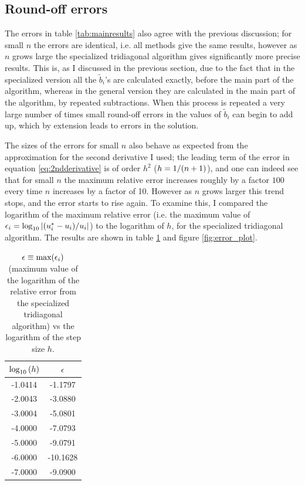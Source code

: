 \documentclass[a4paper,english]{article}
\newcommand\norm[1]{\left\lvert#1\right\rvert}
\let\originalleft\left
\let\originalright\right
\renewcommand{\left}{\mathopen{}\mathclose\bgroup\originalleft}
\renewcommand{\right}{\aftergroup\egroup\originalright}
\begin{document}
\subsection{Round-off errors}
The errors in table \ref{tab:mainresults} also agree with the previous discussion; for small $n$ the errors are identical, i.e. all methods give the same results, however as $n$ grows large the specialized tridiagonal algorithm gives significantly more precise results. This is, as  I discussed in the previous section, due to the fact that in the specialized version all the $\tilde{b}_i$'s are calculated exactly, before the main part of the algorithm, whereas in the general version they are calculated in the main part of the algorithm, by repeated subtractions. When this process is repeated a very large number of times small round-off errors in the values of $\tilde{b}_i$ can begin to add up, which by extension leads to errors in the solution. \par
The sizes of the errors for small $n$ also behave as expected from the approximation for the second derivative I used; the leading term of the error in equation \ref{eq:2ndderivative} is of order $h^2$\cite{lecturenotes} ($h=1/\left(n+1\right)$), and one can indeed see that for small $n$ the maximum relative error increases roughly by a factor $100$ every time $n$ increases by a factor of 10. However as $n$ grows larger this trend stops, and the error starts to rise again. To examine this, I compared the logarithm of the maximum relative error (i.e. the maximum value of $\epsilon_i = \log_{10}{\norm{\left(u^*_i-u_i\right)/u_i}}$) to the logarithm of $h$, for the specialized tridiagonal algorithm. The results are shown in table \ref{tab:error_tab} and figure \ref{fig:error_plot}.
\begin{table}[ht]
  \centering
  \begin{tabular}{c c} \toprule
    $\log_{10}{\left(h\right)}$ & $\epsilon$ \\\midrule
    -1.0414 & -1.1797 \\
    -2.0043 & -3.0880 \\
    -3.0004 & -5.0801 \\
    -4.0000 & -7.0793 \\
    -5.0000 & -9.0791 \\
    -6.0000 & -10.1628 \\
    -7.0000 & -9.0900\\\bottomrule
  \end{tabular}
  \caption{$\epsilon \equiv \text{max}\left(\epsilon_i\right)$ (maximum value of the logarithm of the relative error from the specialized tridiagonal algorithm) vs the logarithm of the step size $h$.}
  \label{tab:error_tab}
\end{table}
\end{document}
